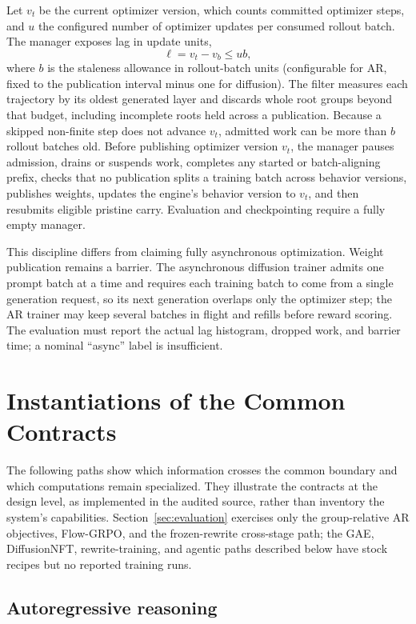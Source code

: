 \documentclass[10pt]{article}
\begin{document}
Let $v_t$ be the current optimizer version, which counts committed optimizer steps, and $u$ the configured number of optimizer updates per consumed rollout batch.
The manager exposes lag in update units,
\begin{equation}
\ell = v_t-v_b \leq u b,
\end{equation}
where $b$ is the staleness allowance in rollout-batch units (configurable for AR, fixed to the publication interval minus one for diffusion).
The filter measures each trajectory by its oldest generated layer and discards whole root groups beyond that budget, including incomplete roots held across a publication.
Because a skipped non-finite step does not advance $v_t$, admitted work can be more than $b$ rollout batches old.
Before publishing optimizer version $v_t$, the manager pauses admission, drains or suspends work, completes any started or batch-aligning prefix, checks that no publication splits a training batch across behavior versions, publishes weights, updates the engine's behavior version to $v_t$, and then resubmits eligible pristine carry.
Evaluation and checkpointing require a fully empty manager.

This discipline differs from claiming fully asynchronous optimization.
Weight publication remains a barrier.
The asynchronous diffusion trainer admits one prompt batch at a time and requires each training batch to come from a single generation request, so its next generation overlaps only the optimizer step; the AR trainer may keep several batches in flight and refills before reward scoring.
The evaluation must report the actual lag histogram, dropped work, and barrier time; a nominal ``async'' label is insufficient.

\section{Instantiations of the Common Contracts}
\label{sec:instantiations}

The following paths show which information crosses the common boundary and which computations remain specialized.
They illustrate the contracts at the design level, as implemented in the audited source, rather than inventory the system's capabilities.
Section~\ref{sec:evaluation} exercises only the group-relative AR objectives, Flow-GRPO, and the frozen-rewrite cross-stage path; the GAE, DiffusionNFT, rewrite-training, and agentic paths described below have stock recipes but no reported training runs.

\subsection{Autoregressive reasoning}
\end{document}
